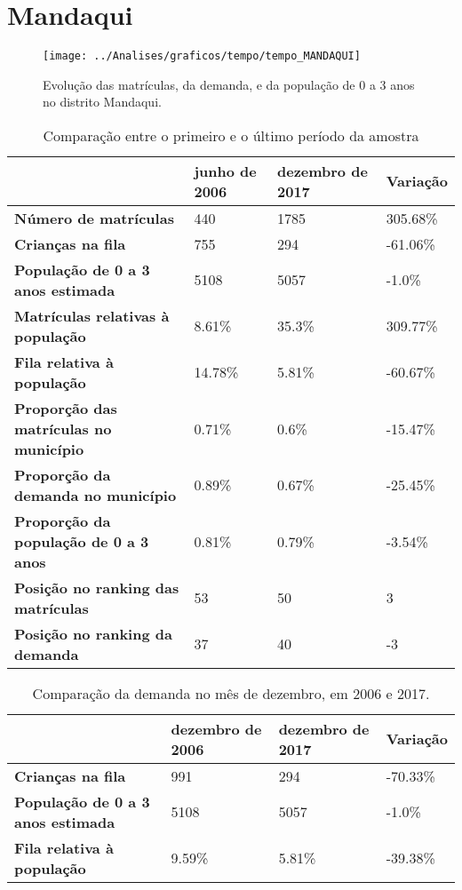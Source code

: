 \section{Mandaqui}
\begin{figure}[H]
\centering
\texttt{[image: ../Analises/graficos/tempo/tempo\_MANDAQUI]}
\caption{Evolução das matrículas, da demanda, e da população de 0 a 3 anos no distrito Mandaqui.}
\end{figure}
\begin{table}[H]
\begin{tabular}{|l|l|l|l|}
\hline
\textbf{}                                      & \textbf{junho de 2006}       & \textbf{dezembro de 2017}    & \textbf{Variação} \\ \hline
\textbf{Número de matrículas}                  & 440 & 1785 & 305.68\% \\ \hline
\textbf{Crianças na fila}                      & 755 & 294 & -61.06\% \\ \hline
\textbf{População de 0 a 3 anos estimada}      & 5108 & 5057 & -1.0\% \\ \hline
\textbf{Matrículas relativas à população}      & 8.61\% & 35.3\% & 309.77\% \\ \hline
\textbf{Fila relativa à população}             & 14.78\% & 5.81\% & -60.67\% \\ \hline
\textbf{Proporção das matrículas no município} & 0.71\% & 0.6\% & -15.47\% \\ \hline
\textbf{Proporção da demanda no município}     & 0.89\% & 0.67\% & -25.45\% \\ \hline
\textbf{Proporção da população de 0 a 3 anos}  & 0.81\% & 0.79\% & -3.54\% \\ \hline
\textbf{Posição no ranking das matrículas}     & 53 & 50 & 3 \\ \hline
\textbf{Posição no ranking da demanda}         & 37 & 40 & -3 \\ \hline
\end{tabular}
\caption{Comparação entre o primeiro e o último período da amostra}
\end{table}
\begin{table}[H]
\begin{tabular}{|l|l|l|l|}
\hline
\textbf{}                                 & \textbf{dezembro de 2006} & \textbf{dezembro de 2017} & \textbf{Variação} \\ \hline
\textbf{Crianças na fila}                      & 991 & 294 & -70.33\% \\ \hline
\textbf{População de 0 a 3 anos estimada}      & 5108 & 5057 & -1.0\% \\ \hline
\textbf{Fila relativa à população}             & 9.59\% & 5.81\% & -39.38\% \\ \hline
\end{tabular}
\caption{Comparação da demanda no mês de dezembro, em 2006 e 2017.}
\end{table}
